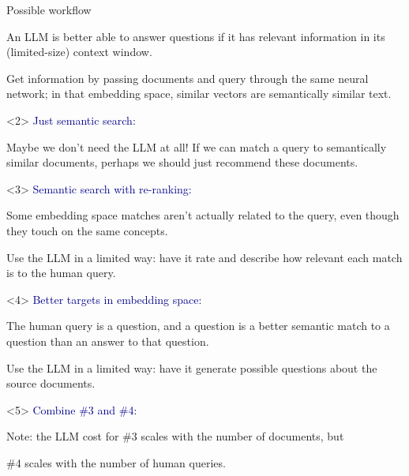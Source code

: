 \documentclass[aspectratio=169]{beamer}
\begin{document}
\begin{frame}{Possible workflow }
\begin{onlyenv}
\large
\vspace{0.25 cm}
An LLM is better able to answer questions if it has relevant information in its (limited-size) context window.

\vspace{0.25 cm}
Get information by passing documents and query through the same neural network; in that embedding space, similar vectors are semantically similar text.

\vspace{10 cm}
\end{onlyenv}\begin{onlyenv}<2>
\textcolor{darkblue}{Just semantic search:}

\large
\vspace{0.25 cm}
Maybe we don't need the LLM at all! If we can match a query to semantically similar documents, perhaps we should just recommend these documents.

\vspace{10 cm}
\end{onlyenv}\begin{onlyenv}<3>
\textcolor{darkblue}{Semantic search with re-ranking:}

\large
\vspace{0.25 cm}
Some embedding space matches aren't actually related to the query, even though they touch on the same concepts.

\vspace{0.25 cm}
Use the LLM in a limited way: have it rate and describe how relevant each match is to the human query.

\vspace{10 cm}
\end{onlyenv}\begin{onlyenv}<4>
\textcolor{darkblue}{Better targets in embedding space:}

\large
\vspace{0.25 cm}
The human query is a question, and a question is a better semantic match to a question than an answer to that question.

\vspace{0.25 cm}
Use the LLM in a limited way: have it generate possible questions about the source documents.

\vspace{10 cm}
\end{onlyenv}\begin{onlyenv}<5>
\textcolor{darkblue}{Combine \#3 and \#4:}

\large
\vspace{0.25 cm}
Note: the LLM cost for \#3 scales with the number of documents, but

\phantom{Note: the LLM cost for }\#4 scales with the number of human queries.
\vspace{10 cm}
\end{onlyenv}
\end{frame}
\end{document}
